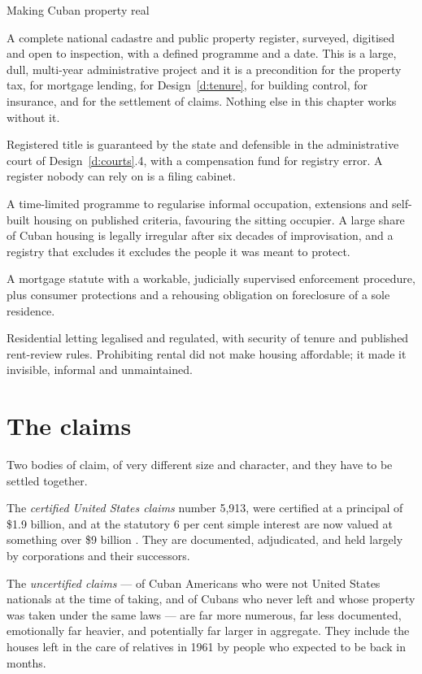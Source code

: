 \begin{design}{Making Cuban property real}
\label{d:cadastre}
\begin{rules}
 A complete national cadastre and public property
register, surveyed, digitised and open to inspection, with a defined programme
and a date. This is a large, dull, multi-year administrative project and it is a
precondition for the property tax, for mortgage lending, for
Design~\ref{d:tenure}, for building control, for insurance, and for the
settlement of claims. Nothing else in this chapter works without it.

 Registered title is guaranteed by the state and
defensible in the administrative court of Design~\ref{d:courts}.4, with a
compensation fund for registry error. A register nobody can rely on is a filing
cabinet.

 A time-limited programme to regularise informal
occupation, extensions and self-built housing on published criteria, favouring
the sitting occupier. A large share of Cuban housing is legally irregular after
six decades of improvisation, and a registry that excludes it excludes the
people it was meant to protect.

 A mortgage statute with a workable, judicially supervised
enforcement procedure, plus consumer protections and a rehousing obligation on
foreclosure of a sole residence.

 Residential letting legalised and regulated, with security
of tenure and published rent-review rules. Prohibiting rental did not make
housing affordable; it made it invisible, informal and unmaintained.
\end{rules}
\end{design}

\section{The claims}

Two bodies of claim, of very different size and character, and they have to be
settled together.

The \emph{certified United States claims} number 5,913, were certified at a
principal of \$1.9 billion, and at the statutory 6 per cent simple interest are
now valued at something over \$9 billion \citep{fcsc}. They are documented, adjudicated, and
held largely by corporations and their successors.

The \emph{uncertified claims} --- of Cuban Americans who were not United States
nationals at the time of taking, and of Cubans who never left and whose property
was taken under the same laws --- are far more numerous, far less documented,
emotionally far heavier, and potentially far larger in aggregate. They include
the houses left in the care of relatives in 1961 by people who expected to be
back in months.

